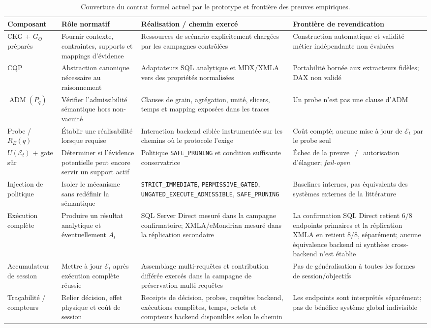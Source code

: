 \begin{table}[!t]
\centering
\caption{Couverture du contrat formel actuel par le prototype et frontière des preuves empiriques.}
\label{tab:prototype-formal-coverage}
\scriptsize
\setlength{\tabcolsep}{3pt}
\renewcommand{\arraystretch}{1.08}
\begin{tabularx}{\textwidth}{@{}p{}p{}X p{}@{}}
\toprule
Composant & Rôle normatif & Réalisation / chemin exercé & Frontière de revendication \\
\midrule
CKG + $G_O$ préparés & Fournir contexte, contraintes, supports et mappings d'évidence & Ressources de scénario explicitement chargées par les campagnes contrôlées & Construction automatique et validité métier indépendante non évaluées \\
CQP & Abstraction canonique nécessaire au raisonnement & Adaptateurs SQL analytique et MDX/XMLA vers des propriétés normalisées & Portabilité bornée aux extracteurs fidèles; DAX non validé \\
$\operatorname{ADM}(P_q)$ & Vérifier l'admissibilité sémantique hors non-vacuité & Clauses de grain, agrégation, unité, slicers, temps et mapping exposées dans les traces & Un probe n'est pas une clause d'ADM \\
Probe / $R_E(q)$ & Établir une réalisabilité lorsque requise & Interaction backend ciblée instrumentée sur les chemins où le protocole l'exige & Coût compté; aucune mise à jour de $\mathcal{E}_t$ par le probe seul \\
$U(\mathcal{E}_t)$ + gate sûr & Déterminer si l'évidence potentielle peut encore servir un support actif & Politique \texttt{SAFE\_PRUNING} et condition suffisante conservatrice & Échec de la preuve $\neq$ autorisation d'élaguer; \emph{fail-open} \\
Injection de politique & Isoler le mécanisme sans redéfinir la sémantique & \texttt{STRICT\_IMMEDIATE}, \texttt{PERMISSIVE\_GATED}, \texttt{UNGATED\_EXECUTE\_ADMISSIBLE}, \texttt{SAFE\_PRUNING} & Baselines internes, pas équivalents des systèmes externes de la littérature \\
Exécution complète & Produire un résultat analytique et éventuellement $A_t$ & SQL Server Direct mesuré dans la campagne confirmatoire; XMLA/eMondrian mesuré dans la réplication secondaire & La confirmation SQL Direct retient 6/8 endpoints primaires et la réplication XMLA en retient 8/8, séparément; aucune équivalence backend ni synthèse cross-backend n'est établie \\
Accumulateur de session & Mettre à jour $\mathcal{E}_t$ après exécution complète réussie & Assemblage multi-requêtes et contribution différée exercés dans la campagne de préservation multi-requêtes & Pas de généralisation à toutes les formes de session/objectifs \\
Traçabilité / compteurs & Relier décision, effet physique et coût de session & Receipts de décision, probes, requêtes backend, exécutions complètes, temps, octets et compteurs backend disponibles selon le chemin & Les endpoints sont interprétés séparément; pas de bénéfice système global indivisible \\
\bottomrule
\end{tabularx}
\end{table}
